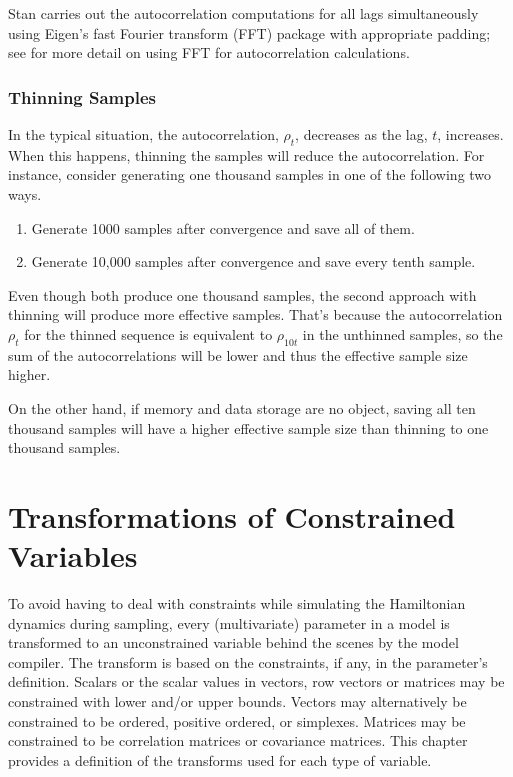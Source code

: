Stan carries out the autocorrelation computations for all lags
simultaneously using Eigen's fast Fourier transform (FFT) package with
appropriate padding; see \citep{Geyer:2011} for more detail on using
FFT for autocorrelation calculations.


\subsection{Thinning Samples}

In the typical situation, the autocorrelation, $\rho_t$, decreases as
the lag, $t$, increases.  When this happens, thinning the samples will
reduce the autocorrelation.  For instance, consider generating one
thousand samples in one of the following two ways.
%
\begin{enumerate}
\item Generate 1000 samples after convergence and save all of
  them.
\item Generate 10,000 samples after convergence and save every tenth
  sample.
\end{enumerate}
%
Even though both produce one thousand samples, the second approach
with thinning will produce more effective samples.  That's because the
autocorrelation $\rho_t$ for the thinned sequence is equivalent to
$\rho_{10t}$ in the unthinned samples, so the sum of the autocorrelations
will be lower and thus the effective sample size higher.

On the other hand, if memory and data storage are no object, saving all
ten thousand samples will have a higher effective sample size than
thinning to one thousand samples.



\chapter{Transformations of Constrained Variables}\label{variable-transforms.chapter}

\noindent
To avoid having to deal with constraints while simulating the
Hamiltonian dynamics during sampling, every (multivariate) parameter
in a \Stan model is transformed to an unconstrained variable behind
the scenes by the model compiler.  The transform is based on the
constraints, if any, in the parameter's definition.  Scalars or the
scalar values in vectors, row vectors or matrices may be constrained
with lower and/or upper bounds.  Vectors may alternatively be
constrained to be ordered, positive ordered, or simplexes.  Matrices
may be constrained to be correlation matrices or covariance matrices.
This chapter provides a definition of the transforms used for each
type of variable.

